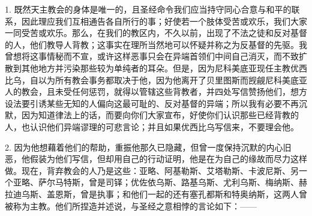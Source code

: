 1. 既然天主教会的身体是唯一的，且圣经命令我们应当持守同心合意与和平的联系，因此理应我们互相通告各自所行的事；好使若一个肢体受苦或欢乐，我们大家一同受苦或欢乐。那么，在我们的教区内，不久以前，出现了不法之徒和反对基督的人，他们教导人背教；这事实在理所当然地可以怀疑并称之为反基督的先驱。我曾想将这事情秘而不宣，或许这样恶事只会在异端首领们中间自己消灭，而不致扩散到其他地方并污染那些较为单纯者的耳朵。但是，因为尼科美底亚现任主教优西比乌，自以为所有教会事务都取决于他，因为他离开了贝里图斯而觊觎尼科美底亚人的教会，且未受任何惩罚，就得以管辖这些背教者，并四处写信赞扬他们，想方设法要引诱某些无知的人偏向这最可耻的、反对基督的异端；所以我有必要不再沉默，因为知道律法上的话，而要向你们大家宣布，好使你们认识那些已经背教的人，也认识他们异端谬理的可悲言论；并且如果优西比乌写信来，不要理会他。\par

2. 因为他想藉着他们的帮助，重振他那久已隐藏，但曾一度保持沉默的内心旧恶，他假装为他们写信，但却用自己的行动证明，他是在为自己的缘故而尽力这样做。现在，背弃教会的人乃是这些：亚略、阿基勒斯、艾塔勒斯、卡波尼斯、另一个亚略、萨尔马特斯，曾是司铎；优佐依乌斯、路基乌斯、尤利乌斯、梅纳斯、赫拉迪乌斯、盖恩斯，曾是执事；和他们一起的还有塞孔都斯和特奥纳斯，这两人曾被称为主教。他们所捏造并述说，与圣经之意相悖的言论如下：——\par

\par

